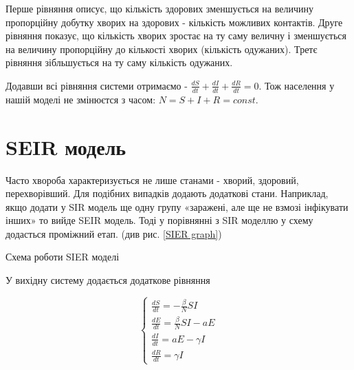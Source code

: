 Перше рівняння описує,
що кількість здорових зменшується на величину 
пропорційну добутку хворих на здорових - кількість можливих контактів. 
Друге рівняння показує, що кількість хворих зростає на ту саму величну і зменшується на величину пропорційну до кількості хворих (кількість одужаних). 
Третє рівняння зібльшується на ту саму кількість одужаних\cite{salimipour_sir_2023}.
\par 
Додавши всі рівняння системи отримаємо - $ \frac{dS}{dt} + \frac{dI}{dt} + \frac{dR}{dt} = 0 $. 
Тож населення у нашій моделі не змінюєтся з часом: $N = S + I + R = const$.


\section{SEIR модель}

Часто хвороба характеризується не лише станами - хворий, здоровий, перехворівший.
Для подібних випадків додають додаткові стани.
Наприклад, якщо додати у SIR модель ще одну групу «заражені, але ще не взмозі інфікувати інших» то вийде SEIR модель. 
Тоді у порівнянні з SIR моделлю у схему додасться проміжний етап. (див рис. \ref{SIER graph})

\begin{risunok}[ht]
    \centering
    \vspace{0.5cm}
    \caption{Схема роботи SIER моделі}
    \label{SIER graph}
\end{risunok}

У вихідну систему додається додаткове рівняння

\begin{equation*}
    \begin{cases}
        \frac{dS}{dt} = - \frac{\beta}{N}SI    \\
        \frac{dE}{dt} = \frac{\beta}{N}SI - aE \\
        \frac{dI}{dt} = aE - \gamma I          \\
        \frac{dR}{dt} = \gamma I
    \end{cases}
\end{equation*}

